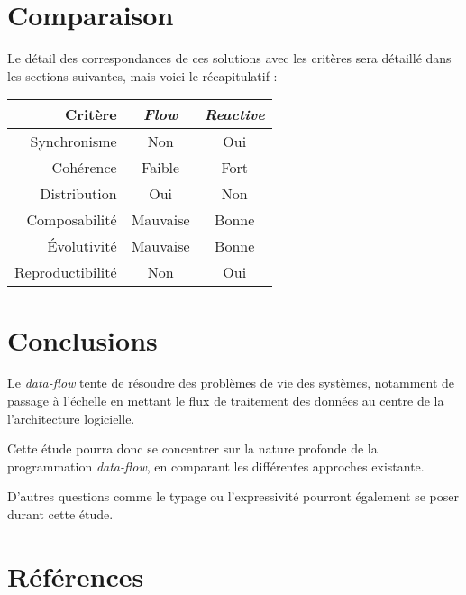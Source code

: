 \documentclass{article}
\begin{document}
\section{Comparaison}
Le détail des correspondances de ces solutions avec les critères sera détaillé
dans les sections suivantes, mais voici le récapitulatif :

\begin{center}
\begin{tabular}{r|c c}
Critère & \emph{Flow} & \emph{Reactive} \\
\hline
Synchronisme & Non & Oui \\
Cohérence & Faible & Fort \\
Distribution & Oui & Non \\
Composabilité & Mauvaise & Bonne \\
Évolutivité & Mauvaise & Bonne \\
Reproductibilité & Non & Oui \\
\end{tabular}
\end{center}

\section{Conclusions}\label{conclusions}

Le \emph{data-flow} tente de résoudre des problèmes de vie des systèmes,
notamment de passage à l'échelle en mettant le flux de traitement des données
au centre de la l'architecture logicielle.

Cette étude pourra donc se concentrer sur la nature profonde de la
programmation \emph{data-flow}, en comparant les différentes approches
existante.

D'autres questions comme le typage ou l'expressivité pourront également
se poser durant cette étude.


\section{Références}\label{références}


\end{document}

